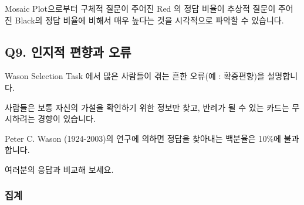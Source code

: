 \documentclass[
]{article}
\begin{document}
Mosaic Plot으로부터 구체적 질문이 주어진 Red 의 정답 비율이 추상적
질문이 주어진 Black의 정답 비율에 비해서 매우 높다는 것을 시각적으로
파악할 수 있습니다.

\subsection{Q9. 인지적 편향과
오류}\label{q9.-uxc778uxc9c0uxc801-uxd3b8uxd5a5uxacfc-uxc624uxb958}

Wason Selection Task 에서 많은 사람들이 겪는 흔한 오류(예 : 확증편향)을
설명합니다.

사람들은 보통 자신의 가설을 확인하기 위한 정보만 찾고, 반례가 될 수 있는
카드는 무시하려는 경향이 있습니다.

Peter C. Wason (1924-2003)의 연구에 의하면 정답을 찾아내는 백분율은
10\%에 불과합니다.

여러분의 응답과 비교해 보세요.

\subsubsection{집계}\label{uxc9d1uxacc4-2}
\end{document}
